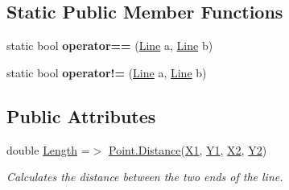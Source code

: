\subsection*{Static Public Member Functions}
\begin{DoxyCompactItemize}
\item 
\mbox{\label{class_s_g_l_1_1_line_a96549db302566a0e3e9d893c520edcb4}} 
static bool {\bfseries operator==} (\mbox{\hyperlink{class_s_g_l_1_1_line}{Line}} a, \mbox{\hyperlink{class_s_g_l_1_1_line}{Line}} b)
\item 
\mbox{\label{class_s_g_l_1_1_line_a098603498d14698cac23a2d1daea73f8}} 
static bool {\bfseries operator!=} (\mbox{\hyperlink{class_s_g_l_1_1_line}{Line}} a, \mbox{\hyperlink{class_s_g_l_1_1_line}{Line}} b)
\end{DoxyCompactItemize}
\subsection*{Public Attributes}
\begin{DoxyCompactItemize}
\item 
double \mbox{\hyperlink{class_s_g_l_1_1_line_a58ee417f43a6acd3b7c4f00c190c26fa}{Length}} =$>$ \mbox{\hyperlink{struct_s_g_l_1_1_point_a88dc45979fe8192615705469fc12f18b}{Point.\+Distance}}(\mbox{\hyperlink{class_s_g_l_1_1_line_a4485492024fc96d2db3aa34d699f974e}{X1}}, \mbox{\hyperlink{class_s_g_l_1_1_line_a1875f7240fd5be5323aaef118c9308c0}{Y1}}, \mbox{\hyperlink{class_s_g_l_1_1_line_ab6dcb09fcf8983e99c5230d4321bbfc8}{X2}}, \mbox{\hyperlink{class_s_g_l_1_1_line_af3571b932c09f78f70e288770e266341}{Y2}})
\begin{DoxyCompactList}\small\item\em Calculates the distance between the two ends of the line. \end{DoxyCompactList}\end{DoxyCompactItemize}
